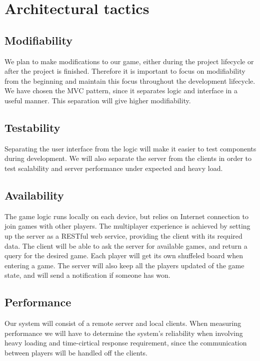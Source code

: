 \section{Architectural tactics}
\label{sec:architecturaltactics}

\subsection{Modifiability} 
We plan to make modifications to our game, either during the project lifecycle or after the project is finished. Therefore it is important to focus on modifiability from the beginning and maintain this focus throughout the development lifecycle. 
We have chosen the MVC pattern, since it separates logic and interface in a useful manner. This separation will give higher modifiability.

\subsection{Testability}
Separating the user interface from the logic will make it easier to test components during development. We will also separate the server from the clients in order to test scalability and server performance under expected and heavy load.


\subsection{Availability} 
The game logic runs locally on each device, but relies on Internet connection to join games with other players. The multiplayer experience is achieved by setting up the server as a RESTful web service, providing the client with its required data. The client will be able to ask the server for available games, and return a query for the desired game. Each player will get its own shuffeled board when entering a game. The server will also keep all the players updated of the game state, and will send a notification if someone has won.


\subsection{Performance}
Our system will consist of a remote server and local clients. When measuring performance we will have to determine the system's reliability when involving heavy loading and time-cirtical response requirement, since the communication between players will be handled off the clients. 

